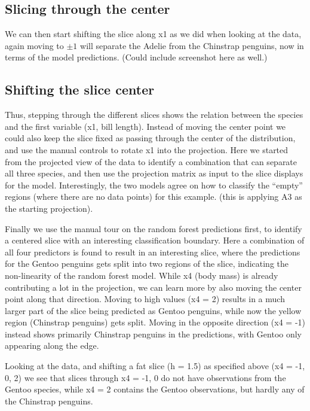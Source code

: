 \documentclass[]{interact}
\theoremstyle{plain}%
\theoremstyle{definition}
\theoremstyle{remark}
\begin{document}
\hypertarget{slicing-through-the-center}{%
\subsection{Slicing through the
center}\label{slicing-through-the-center}}

We can then start shifting the slice along x1 as we did when looking at
the data, again moving to \(\pm 1\) will separate the Adelie from the
Chinstrap penguins, now in terms of the model predictions. (Could
include screenshot here as well.)

\hypertarget{shifting-the-slice-center}{%
\subsection{Shifting the slice center}\label{shifting-the-slice-center}}

Thus, stepping through the different slices shows the relation between
the species and the first variable (x1, bill length). Instead of moving
the center point we could also keep the slice fixed as passing through
the center of the distribution, and use the manual controls to rotate x1
into the projection. Here we started from the projected view of the data
to identify a combination that can separate all three species, and then
use the projection matrix as input to the slice displays for the model.
Interestingly, the two models agree on how to classify the ``empty''
regions (where there are no data points) for this example. (this is
applying A3 as the starting projection).

Finally we use the manual tour on the random forest predictions first,
to identify a centered slice with an interesting classification
boundary. Here a combination of all four predictors is found to result
in an interesting slice, where the predictions for the Gentoo penguins
gets split into two regions of the slice, indicating the non-linearity
of the random forest model. While x4 (body mass) is already contributing
a lot in the projection, we can learn more by also moving the center
point along that direction. Moving to high values (x4 = 2) results in a
much larger part of the slice being predicted as Gentoo penguins, while
now the yellow region (Chinstrap penguins) gets split. Moving in the
opposite direction (x4 = -1) instead shows primarily Chinstrap penguins
in the predictions, with Gentoo only appearing along the edge.

Looking at the data, and shifting a fat slice (h = 1.5) as specified
above (x4 = -1, 0, 2) we see that slices through x4 = -1, 0 do not have
observations from the Gentoo species, while x4 = 2 contains the Gentoo
observations, but hardly any of the Chinstrap penguins.
\end{document}
